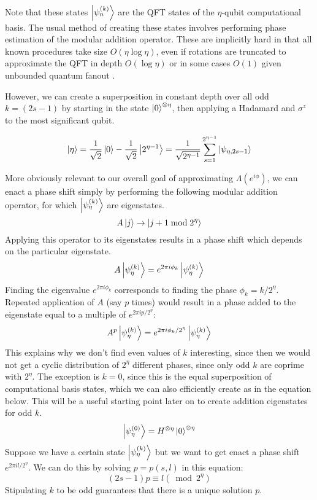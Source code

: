Note that these states $\left\vert{\psi^{(k)}_n}\right\rangle$ are the
QFT states of the $\eta$-qubit computational basis. The usual method of
creating these states involves performing phase estimation of the
modular addition operator. These are implicitly hard in that
all known procedures take size $O(\eta\log \eta)$, even if rotations
are truncated to approximate the QFT in depth $O(\log \eta)$
\cite{Jones2012} or in some cases $O(1)$
given unbounded quantum fanout
\cite{Browne2009}.

However, we can create a superposition in constant depth
over all odd $k=(2s-1)$
by starting in the state $\left\vert{0}\right\rangle^{\otimes \eta}$,
then applying a Hadamard and $\sigma^z$ to the most significant qubit.

\begin{equation}
\left\vert{\eta}\right\rangle = \frac{1}{\sqrt{2}} \left\vert{0}\right\rangle - \frac{1}{\sqrt{2}} \left\vert{2^{\eta-1}}\right\rangle =
\frac{1}{\sqrt{2^{\eta-1}}} \sum_{s=1}^{2^{\eta-1}} \left\vert{\psi_{\eta,2s-1}}\right\rangle
\end{equation}

More obviously relevant to our overall goal of approximating
$\Lambda(e^{i\phi})$, we can enact a phase
shift simply by performing the following modular addition operator, for
which $\left\vert{\psi_{\eta}^{(k)}}\right\rangle$ are eigenstates.
%
\begin{equation}
A\left\vert{j}\right\rangle \rightarrow \left\vert{j+1 \bmod 2^{\eta}}\right\rangle
\end{equation}
%
Applying this operator to its eigenstates results in a phase shift which
depends on the particular eigenstate.
%
\begin{equation}
A\left\vert{\psi_{\eta}^{(k)}}\right\rangle = e^{2\pi i \phi_k} \left\vert{\psi_{\eta}^{(k)}}\right\rangle
\end{equation}
%
Finding the eigenvalue $e^{2\pi i \phi_k}$ corresponds to finding
the phase $\phi_k = k / 2^{\eta}$.
Repeated application of $A$ (say $p$ times) would result in a phase
added to the eigenstate equal to a multiple of $e^{2\pi i p / 2^{\eta}}$:
%
\begin{equation}
A^p\left\vert{\psi_{\eta}^{(k)}}\right\rangle = e^{2\pi i \phi_k / 2^{\eta}} \left\vert{\psi_{\eta}^{(k)}}\right\rangle
\end{equation}
%
This explains why we don't find even values of $k$ interesting,
since then we would not get a
cyclic distribution of $2^{\eta}$ different phases,
since only odd $k$
are coprime with $2^{\eta}$. The exception is $k=0$, since this is the
equal superposition of computational basis states, which we can also
efficiently create as in the equation below.
This will be a useful starting point later on to
create addition eigenstates
for odd $k$.
%
\begin{equation}
\left\vert{\psi_{\eta}^{(0)}}\right\rangle = H^{\otimes \eta}\left\vert{0}\right\rangle^{\otimes \eta}
\end{equation}
%
Suppose we have a certain state $\left\vert{\psi_{\eta}^{(k)}}\right\rangle$ but we want to get enact
a phase shift $e^{2\pi i l / 2^{\eta}}$. We can do this by solving $p=p(s,l)$
in this equation:
%
\begin{equation}
(2s-1)p \equiv l (\bmod 2^{\eta})
\label{eqn:psl}
\end{equation}
%
Stipulating $k$ to be odd guarantees that there is a unique solution $p$.

